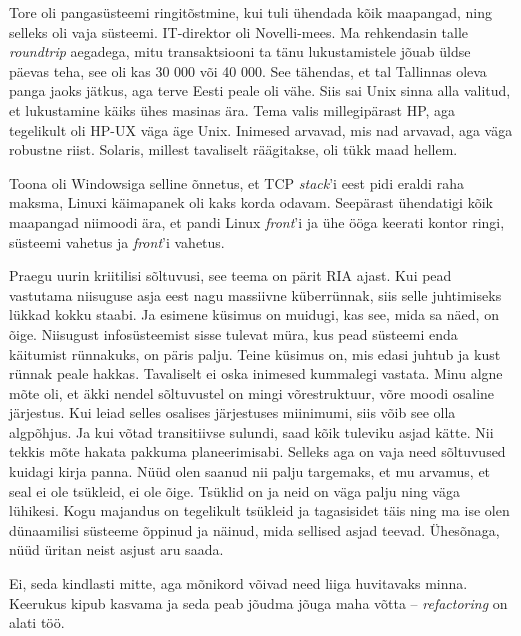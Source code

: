 Tore oli pangasüsteemi ringitõstmine, kui tuli ühendada kõik 
maapangad, ning selleks oli vaja süsteemi. 
IT-direktor oli 
Novelli-mees. Ma rehkendasin talle \emph{roundtrip} aegadega, mitu 
transaktsiooni ta tänu lukustamistele jõuab üldse päevas teha, see oli kas 30 
000 või 40 000. See tähendas, et tal Tallinnas oleva 
panga jaoks jätkus, aga terve Eesti peale oli vähe. Siis sai Unix sinna alla 
valitud, et lukustamine käiks ühes masinas ära. Tema valis millegipärast HP, aga
tegelikult oli HP-UX väga äge Unix. Inimesed arvavad, mis 
nad arvavad, aga väga robustne riist. Solaris, millest tavaliselt 
räägitakse, oli tükk maad hellem. 

Toona oli Windowsiga selline õnnetus, et TCP \emph{stack}'i eest 
pidi eraldi raha maksma, Linuxi käimapanek oli kaks korda odavam. Seepärast ühendatigi
kõik maapangad niimoodi ära, et pandi Linux \emph{front}'i ja 
ühe ööga keerati kontor ringi, süsteemi vahetus ja \emph{front}'i vahetus. 


Praegu uurin kriitilisi sõltuvusi, see teema on pärit 
RIA ajast. 
Kui pead vastutama niisuguse asja eest nagu massiivne küberrünnak, siis 
selle juhtimiseks lükkad kokku staabi. Ja esimene küsimus on muidugi, kas see, mida sa näed, on õige. Niisugust infosüsteemist 
sisse tulevat müra, kus pead süsteemi enda käitumist rünnakuks, on 
päris palju. Teine küsimus on, mis edasi 
juhtub ja kust rünnak peale hakkas. Tavaliselt ei oska inimesed kummalegi 
vastata. Minu algne mõte oli, et äkki nendel sõltuvustel on mingi 
võrestruktuur, võre moodi osaline järjestus. Kui leiad
selles osalises järjestuses miinimumi, siis võib see olla algpõhjus. Ja kui võtad transitiivse 
sulundi, saad kõik tuleviku asjad kätte. Nii tekkis mõte hakata pakkuma 
planeerimisabi. Selleks aga on vaja 
need sõltuvused kuidagi kirja panna. Nüüd olen saanud nii palju targemaks, 
et mu arvamus, et seal ei ole tsükleid, ei ole õige. Tsüklid on ja neid on väga 
palju ning väga lühikesi. Kogu majandus on tegelikult tsükleid ja tagasisidet 
täis ning ma ise olen dünaamilisi süsteeme õppinud ja näinud, mida sellised asjad teevad. Ühesõnaga, nüüd üritan neist asjust aru saada.


Ei, seda kindlasti mitte, aga mõnikord võivad need liiga huvitavaks minna. 
Keerukus kipub kasvama ja seda peab jõudma
jõuga maha võtta – \emph{refactoring} on alati töö.
